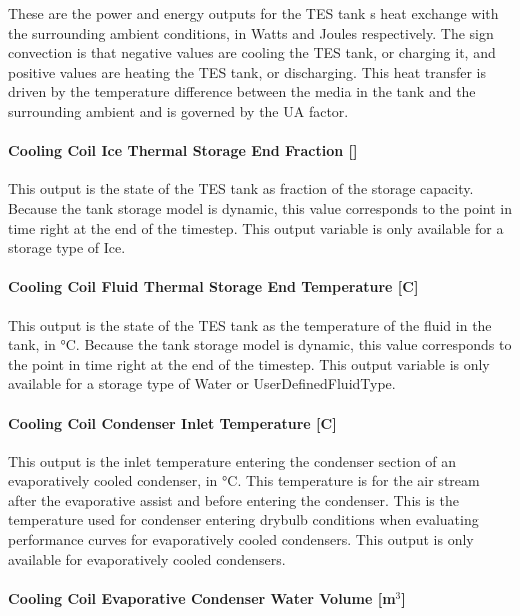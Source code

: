 These are the power and energy outputs for the TES tank s heat exchange with the surrounding ambient conditions, in Watts and Joules respectively. The sign convection is that negative values are cooling the TES tank, or charging it, and positive values are heating the TES tank, or discharging. This heat transfer is driven by the temperature difference between the media in the tank and the surrounding ambient and is governed by the UA factor.

\paragraph{Cooling Coil Ice Thermal Storage End Fraction {[]}}\label{cooling-coil-ice-thermal-storage-end-fraction}

This output is the state of the TES tank as fraction of the storage capacity. Because the tank storage model is dynamic, this value corresponds to the point in time right at the end of the timestep. This output variable is only available for a storage type of Ice.

\paragraph{Cooling Coil Fluid Thermal Storage End Temperature {[}C{]}}\label{cooling-coil-fluid-thermal-storage-end-temperature-c}

This output is the state of the TES tank as the temperature of the fluid in the tank, in °C. Because the tank storage model is dynamic, this value corresponds to the point in time right at the end of the timestep. This output variable is only available for a storage type of Water or UserDefinedFluidType.

\paragraph{Cooling Coil Condenser Inlet Temperature {[}C{]}}\label{cooling-coil-condenser-inlet-temperature-c-2}

This output is the inlet temperature entering the condenser section of an evaporatively cooled condenser, in °C. This temperature is for the air stream after the evaporative assist and before entering the condenser. This is the temperature used for condenser entering drybulb conditions when evaluating performance curves for evaporatively cooled condensers. This output is only available for evaporatively cooled condensers.

\paragraph{Cooling Coil Evaporative Condenser Water Volume {[}m\(^{3}\){]}}\label{cooling-coil-evaporative-condenser-water-volume-m3-2}

